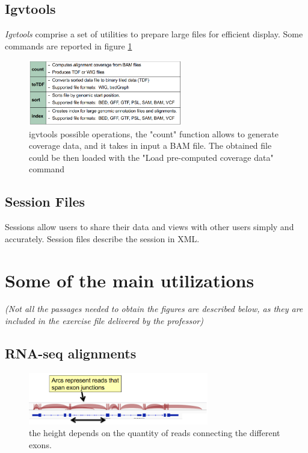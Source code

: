 \subsection{Igvtools}
\textit{Igvtools} comprise a set of utilities to prepare large files for efficient
display. Some commands are reported in figure \ref{fig:commands}

\begin{figure}[H]
    \centering
    \includegraphics[width=0.6\textwidth]{igvtools.PNG}
    \caption{igvtools possible operations, the "count" function allows to generate coverage data, and it takes in input a BAM file. The obtained
    file could be then loaded with the "Load pre-computed coverage data" command}
    \label{fig:commands}
\end{figure}

\subsection{Session Files}
Sessions allow users to share their data and views with other users simply and accurately. Session files describe the session in XML.

\section{Some of the main utilizations}
\textit{(Not all the passages needed to obtain the figures are described below, as they are included in the exercise file delivered by the professor)}

\subsection{RNA-seq alignments}
\begin{figure}[H]
    \centering
    \includegraphics[width=0.7\textwidth]{RNAseqAlign.PNG}
    \caption{the height depends on the quantity of reads connecting the different exons.}
    \label{fig:RNAseq}
\end{figure}

